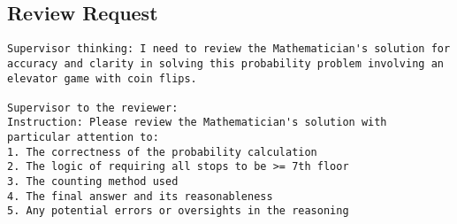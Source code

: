 \subsection{Review Request}
\vspace{-0.5em}
\begin{supervisorbox}
\begin{lstlisting}
Supervisor thinking: I need to review the Mathematician's solution for accuracy and clarity in solving this probability problem involving an elevator game with coin flips.

Supervisor to the reviewer:
Instruction: Please review the Mathematician's solution with particular attention to:
1. The correctness of the probability calculation
2. The logic of requiring all stops to be >= 7th floor
3. The counting method used
4. The final answer and its reasonableness
5. Any potential errors or oversights in the reasoning

\end{lstlisting}
\end{supervisorbox}

